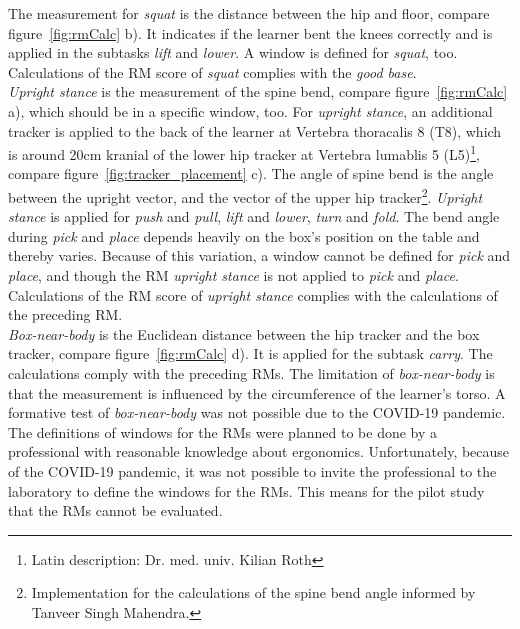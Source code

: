 The measurement for \textit{squat} is the distance between the hip and floor, compare figure~\ref{fig:rmCalc} b). It indicates if the learner bent the knees correctly and is applied in the subtasks \textit{lift} and \textit{lower}. A window is defined for \textit{squat}, too. Calculations of the RM score of \textit{squat} complies with the \textit{good base}.\\
\textit{Upright stance} is the measurement of the spine bend, compare figure~\ref{fig:rmCalc} a), which should be in a specific window, too. For \textit{upright stance}, an additional tracker is applied to the back of the learner at Vertebra thoracalis 8 (T8), which is around 20cm kranial of the lower hip tracker at Vertebra lumablis 5 (L5)\footnote{Latin description: Dr. med. univ. Kilian Roth}, compare figure~\ref{fig:tracker_placement} c). The angle of spine bend is the angle between the upright vector, and the vector of the upper hip tracker\footnote{Implementation for the calculations of the spine bend angle informed by Tanveer Singh Mahendra.}. \textit{Upright stance} is applied for \textit{push} and \textit{pull}, \textit{lift} and \textit{lower}, \textit{turn} and \textit{fold}. The bend angle during \textit{pick} and \textit{place} depends heavily on the box's position on the table and thereby varies. Because of this variation, a window cannot be defined for \textit{pick} and \textit{place}, and though the RM \textit{upright stance} is not applied to \textit{pick} and \textit{place}. Calculations of the RM score of \textit{upright stance} complies with the calculations of the preceding RM.\\
\textit{Box-near-body} is the Euclidean distance between the hip tracker and the box tracker, compare figure~\ref{fig:rmCalc} d). It is applied for the subtask \textit{carry}. The calculations comply with the preceding RMs. The limitation of \textit{box-near-body} is that the measurement is influenced by the circumference of the learner's torso. A formative test of \textit{box-near-body} was not possible due to the COVID-19 pandemic.\\

The definitions of windows for the RMs were planned to be done by a professional with reasonable knowledge about ergonomics. Unfortunately, because of the COVID-19 pandemic, it was not possible to invite the professional to the laboratory to define the windows for the RMs. This means for the pilot study that the RMs cannot be evaluated.

